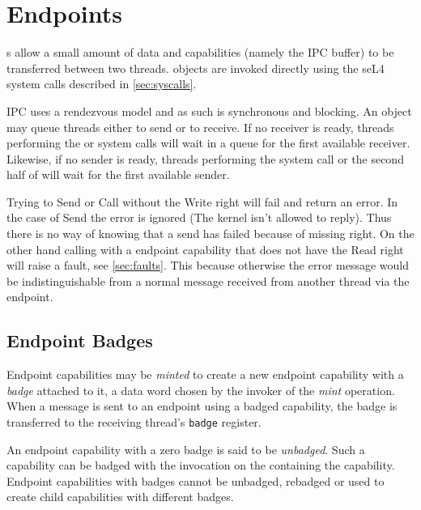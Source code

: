 \section{Endpoints}

s allow a small amount
of data and capabilities (namely the IPC buffer) to be transferred between two
threads.  objects are invoked directly using the seL4 system calls
described in \autoref{sec:syscalls}.

IPC  uses a rendezvous model and as such is
synchronous and blocking. An  object  may queue
threads either to send or to receive. If no receiver is ready, threads
performing the  or 
system calls will wait in a queue for the first available receiver. Likewise, if
no sender is ready, threads performing the 
system call or the second half of 
will wait for the first available sender.

Trying to Send or Call without the Write right will fail and return an error. In
the case of Send the error is ignored (The kernel isn't allowed to reply). Thus
there is no way of knowing that a send has failed because of missing right.
On the other hand calling  with a endpoint capability that
does not have the Read right will raise a fault, see \autoref{sec:faults}. This
because otherwise the error message would be indistinguishable from a normal
message received from another thread via the endpoint.

\subsection{Endpoint Badges\label{s:ep-badge}}
\label{sec:ep-badges}

Endpoint capabilities may be \emph{minted} to
create a new endpoint capability with a \emph{badge} attached to it, a data
word chosen by the invoker of the \emph{mint} operation. When a message is sent to an endpoint using a badged
capability, the badge is transferred to the receiving thread's
\texttt{badge} register.

An endpoint capability with a zero badge is said to be \emph{unbadged}.
Such a capability can be badged with the 
invocation on the  containing the capability. Endpoint
capabilities with badges cannot be unbadged, rebadged or used to create
child capabilities with different badges.

